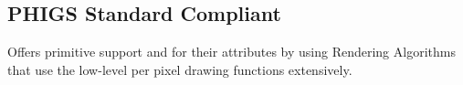 
        \subsection*{PHIGS Standard Compliant}
            Offers primitive support and for their attributes by using Rendering Algorithms that use the low-level per pixel drawing functions extensively.


